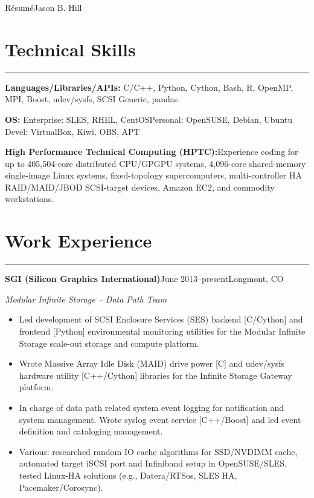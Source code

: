 \documentclass[letterpaper,10pt]{article}
\newcommand{\mblue}{\color{darkblue}}
\begin{document}
\pagestyle{empty}

{\large\mblue R\'esum\'e}\hfill{\Huge\mblue Jason B. Hill}


\section*{\mblue Technical Skills}

\vspace{-2.15pc} {\hfill\mblue\rule{5.37in}{0.02cm}}

\vspace{1pc} \textbf{Languages/Libraries/APIs:} C/C++, Python, Cython, Bash, R, OpenMP, MPI, Boost,
udev/sysfs, SCSI Generic, pandas 

\bigbreak\textbf{OS:} Enterprise: SLES, RHEL, CentOS\qquad Personal: OpenSUSE, Debian, Ubuntu\qquad
Devel: VirtualBox, Kiwi, OBS, APT

\bigbreak\textbf{High Performance Technical Computing (HPTC):}\quad Experience coding for up to
405,504-core distributed CPU/GPGPU systems, 4,096-core shared-memory single-image Linux systems,
fixed-topology supercomputers, multi-controller HA RAID/MAID/JBOD SCSI-target devices, Amazon EC2,
and commodity workstations.


\section*{\mblue Work Experience}

\vspace{-2.15pc}
{\hfill\mblue\rule{5.245in}{0.02cm}}

\vspace{1pc}
\textbf{SGI (Silicon Graphics International)}\quad June 2013--present\hfill Longmont, CO

\bigbreak
\textit{Modular Infinite Storage -- Data Path Team}

\begin{itemize} \item Led development of SCSI Enclosure Services (SES) backend [C/Cython] and
frontend [Python] environmental monitoring utilities for the Modular Infinite Storage scale-out
storage and compute platform.

\item Wrote Massive Array Idle Disk (MAID) drive power [C] and udev/sysfs hardware utility
[C++/Cython] libraries for the Infinite Storage Gateway platform.

\item In charge of data path related system event logging for notification and system management.
Wrote syslog event service [C++/Boost] and led event definition and cataloging management.

\item Various: researched random IO cache algorithms for SSD/NVDIMM cache, automated target iSCSI
port and Infiniband setup in OpenSUSE/SLES, tested Linux-HA solutions (e.g., Datera/RTSos, SLES HA,
Pacemaker/Corosync).  \end{itemize}
\end{document}
